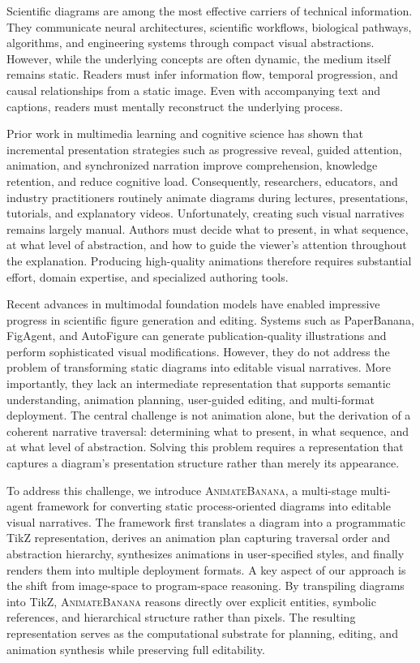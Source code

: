 \documentclass{article} %
\begin{document}
Scientific diagrams are among the most effective carriers of technical information. They communicate neural architectures, scientific workflows, biological pathways, algorithms, and engineering systems through compact visual abstractions. However, while the underlying concepts are often dynamic, the medium itself remains static. Readers must infer information flow, temporal progression, and causal relationships from a static image. Even with accompanying text and captions, readers must mentally reconstruct the underlying process.

Prior work in multimedia learning and cognitive science has shown that incremental presentation strategies such as progressive reveal, guided attention, animation, and synchronized narration improve comprehension, knowledge retention, and reduce cognitive load. Consequently, researchers, educators, and industry practitioners routinely animate diagrams during lectures, presentations, tutorials, and explanatory videos. Unfortunately, creating such visual narratives remains largely manual. Authors must decide what to present, in what sequence, at what level of abstraction, and how to guide the viewer's attention throughout the explanation. Producing high-quality animations therefore requires substantial effort, domain expertise, and specialized authoring tools.

Recent advances in multimodal foundation models have enabled impressive progress in scientific figure generation and editing. Systems such as PaperBanana, FigAgent, and AutoFigure can generate publication-quality illustrations and perform sophisticated visual modifications. However, they do not address the problem of transforming static diagrams into editable visual narratives. More importantly, they lack an intermediate representation that supports semantic understanding, animation planning, user-guided editing, and multi-format deployment. The central challenge is not animation alone, but the derivation of a coherent narrative traversal: determining what to present, in what sequence, and at what level of abstraction. Solving this problem requires a representation that captures a diagram's presentation structure rather than merely its appearance.

To address this challenge, we introduce \textsc{AnimateBanana}, a multi-stage multi-agent framework for converting static process-oriented diagrams into editable visual narratives. The framework first translates a diagram into a programmatic TikZ representation, derives an animation plan capturing traversal order and abstraction hierarchy, synthesizes animations in user-specified styles, and finally renders them into multiple deployment formats. A key aspect of our approach is the shift from image-space to program-space reasoning. By transpiling diagrams into TikZ, \textsc{AnimateBanana} reasons directly over explicit entities, symbolic references, and hierarchical structure rather than pixels. The resulting representation serves as the computational substrate for planning, editing, and animation synthesis while preserving full editability.
\end{document}
